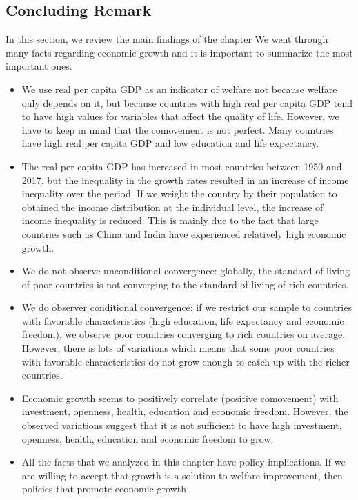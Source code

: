 \documentclass[letterpaper]{article}\usepackage[]{graphicx}\usepackage[]{color}
\numberwithin{exer}{section}
\theoremstyle{nonumberplain}
\begin{document}
\subsection{Concluding Remark}
In this section, we review the main findings of the chapter We went
through many facts regarding economic growth and it is important to
summarize the most important ones. 
\begin{itemize}
\item We use real per capita GDP as an indicator of welfare not
  because welfare only depends on it, but because countries with high
  real per capita GDP tend to have high values for variables that
  affect the quality of life. However, we have to keep in mind that
  the comovement is not perfect. Many countries have high real per
  capita GDP and low education and life expectancy.
\item The real per capita GDP has increased in most countries between
  1950 and 2017, but the inequality in the growth rates resulted in an
  increase of income inequality over the period. If we weight the
  country by their population to obtained the income distribution at
  the individual level, the increase of income inequality is
  reduced. This is mainly due to the fact that large countries such as
  China and India have experienced relatively high economic growth.
\item We do not observe unconditional convergence: globally, the
  standard of living of poor countries is not converging to the
  standard of living of rich countries.
\item We do observer conditional convergence: if we restrict our
  sample to countries with favorable characteristics (high education,
  life expectancy and economic freedom), we observe poor countries
  converging to rich countries on average. However, there is lots of
  variations which means that some poor countries with favorable
  characteristics do not grow enough to catch-up with the richer
  countries.
\item Economic growth seems to positively correlate (positive
  comovement) with investment, openness, health, education and
  economic freedom. However, the observed variations suggest that it
  is not sufficient to have high investment, openness, health,
  education and economic freedom to grow. 
\item All the facts that we analyzed in this chapter have policy
  implications. If we are willing to accept that growth is a solution
  to welfare improvement, then policies that promote economic growth

\end{itemize}
\end{document}
